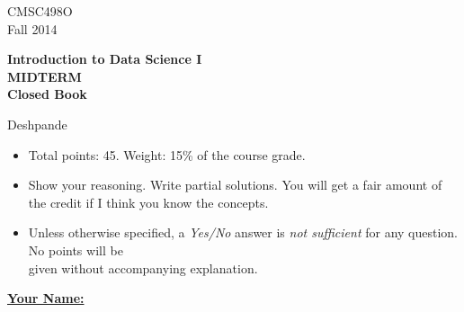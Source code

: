 \documentclass[11pt]{article}
\begin{document}
{
\begin{center}
\large
\vspace{5pt}
\parbox{1.5in}{CMSC498O\\ Fall 2014} \parbox{3in}{\begin{center}\bf Introduction to Data Science I \\ MIDTERM \\ Closed Book\end{center}}
\parbox{1.5in}{Deshpande}
\end{center}
}

\begin{itemize}
\item Total points: 45. Weight: 15\% of the course grade. 
\item Show your reasoning. Write partial solutions. You will get a fair amount of the credit if I think you
know the concepts.

\item Unless otherwise specified, a {\em Yes/No} answer is {\em not sufficient} for any question. No points will be \\ given without
accompanying explanation.
\end{itemize}

\underline{\bf \large Your Name:} 



\newcommand{\qonetopic}{Misc Questions}
\newcommand{\qtwotopic}{Modelling}
\newcommand{\qthreetopic}{Functional Dependencies/Normalization}
\newcommand{\qfourtopic}{Relational Algebra/SQL}
\newcommand{\qfivetopic}{Buffer Management}

\newcommand{\er}{\textbf{(E/R Modeling)}}
\newcommand{\normalization}{\textbf{(Normalization)}}
\newcommand{\raid}{\textbf{(RAID)}}


\end{document}
